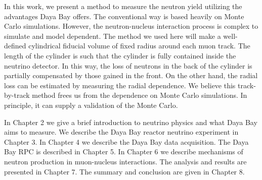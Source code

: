 In this work, we present a method to measure the neutron yield utilizing the advantages Daya Bay offers. The conventional way is based heavily on Monte Carlo simulations. However, the neutron-nucleus interaction process is complex to simulate and model dependent. The method we used here will make a well-defined cylindrical fiducial volume of fixed radius around each muon track. The length of the cylinder is such that the cylinder is fully contained inside the neutrino detector. In this way, the loss of neutrons in the back of the cylinder is partially compensated by those gained in the front. On the other hand, the radial loss can be estimated by measuring the radial dependence. We believe this track-by-track method frees us from the dependence on Monte Carlo simulations. In principle, it can supply a validation of the Monte Carlo. 

In Chapter 2 we give a brief introduction to neutrino physics and what Daya Bay aims to measure. We describe the Daya Bay reactor neutrino experiment in Chapter 3. In Chapter 4 we describe the Daya Bay data acquisition. The Daya Bay RPC is described in Chapter 5. In Chapter 6 we describe mechanisms of neutron production in muon-nucleus interactions. The analysis and results are presented in Chapter 7. The summary and conclusion are given in Chapter 8.